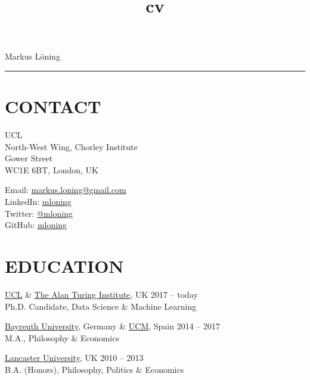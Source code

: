 \documentclass{cv}
\title{cv}
\begin{document}
{\LARGE Markus Löning}
\vspace{12pt}
\hrule

\section{CONTACT}

\begin{minipage}{.44\textwidth}
\vspace{3pt}
{\raggedright{} UCL \\
North-West Wing, Chorley Institute \\
Gower Street \\
WC1E 6BT, London, UK}
\end{minipage}
\hspace{1.25cm}
\begin{minipage}{.44\textwidth}
\vspace{3pt}
Email: \href{mailto:markus.loning@gmail.com}{markus.loning@gmail.com} \\
LinkedIn: \href{https://linkedin.com/in/mloning}{mloning} \\
Twitter: \href{https://twitter.com/mloning_}{@mloning\textunderscore} \\
GitHub: \href{https://github.com/mloning}{mloning}
\end{minipage}


\section{EDUCATION}

\href{https://www.ucl.ac.uk/}{UCL} \& \href{https://www.turing.ac.uk/}{The Alan Turing Institute}, UK \hfill 2017 -- today \\
Ph.D. Candidate, Data Science \& Machine Learning \hfill 
\vspace{15pt}

\href{https://www.uni-bayreuth.de/en/}{Bayreuth University}, Germany \& \href{https://www.ucm.es/english}{UCM}, Spain \hfill 2014 -- 2017 \\
M.A., Philosophy \& Economics \hfill 
\vspace{15pt}

\href{https://www.lancs.ac.uk/}{Lancaster University}, UK \hfill 2010 -- 2013 \\
B.A. (Honors), Philosophy, Politics \& Economics \hfill 
\end{document}
